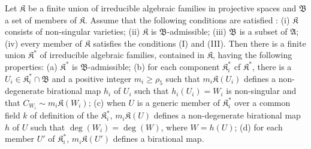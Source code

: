 \begin{lemma}\label{art14-lem18}
Let $\mathfrak{K}$ be a finite union of irreducible algebraic families in projective spaces and $\mathfrak{B}$ a set of members of $\mathfrak{K}$. Assume that the following conditions are satisfied : {\rm(i)} $\mathfrak{K}$ consists of non-singular varieties; {\rm(ii)} $\mathfrak{K}$ is $\mathfrak{B}$-admissible; {\rm(iii)} $\mathfrak{B}$ is a subset of $\mathfrak{A}$; {\rm(iv)} every member of $\mathfrak{K}$ satisfies the conditions {\rm(I)} and {\rm(III)}. Then there is a finite union $\mathfrak{K}^{*}$ of irreducible algebraic families, contained in $\mathfrak{K}$, having the following properties: {\rm(a)} $\mathfrak{K}^{*}$ is $\mathfrak{B}$-admissible; {\rm(b)} for each component $\mathfrak{K}^{*}_{i}$ cf $\mathfrak{K}^{*}$, there is a $U_{i}\in \mathfrak{K}^{*}_{i}\cap \mathfrak{B}$ and a positive integer $m_{i}\geq \rho_{5}$ such that $m_{i}\mathfrak{K}(U_{i})$ defines a non-degenerate birational map $h_{i}$ of $U_{i}$ such that $h_{i}(U_{i})=W_{i}$ is non-singular and that $C_{W_{i}}\sim m_{i}\mathfrak{K}(W_{i})$; {\rm(c)} when $U$ is a generic member of $\mathfrak{K}^{*}_{i}$ over a common field $k$ of definition of the $\mathfrak{K}^{*}_{i}$, $m_{i}\mathfrak{K}(U)$ defines a non-degenerate birational map $h$ of $U$ such that $\deg(W_{i})=\deg(W)$, where $W=h(U)$; {\rm(d)} for each member $U'$ of $\mathfrak{K}^{*}_{i}$, $m_{i}\mathfrak{K}(U')$ defines a birational map.
\end{lemma}

